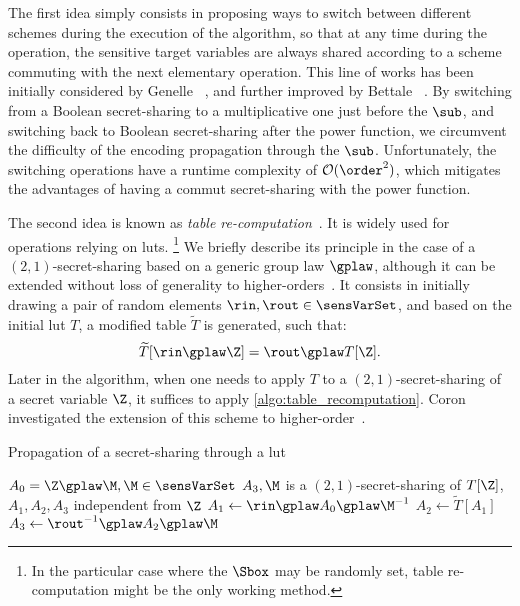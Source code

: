The first idea simply consists in proposing ways to switch between different schemes during the execution of the algorithm, so that at any time during the operation, the sensitive target variables are always shared according to a scheme commuting with the next elementary operation.
This line of works has been initially considered by Genelle \etal{}~\cite{genelle_secure_2010}, and further improved by Bettale \etal{}~\cite{bettale_improved_2018}.
By switching from a Boolean secret-sharing to a multiplicative one just before the \(\sub\), and switching back to Boolean secret-sharing after the power function, we circumvent the difficulty of the encoding propagation through the \(\sub\).
Unfortunately, the switching operations have a runtime complexity of \(\mathcal{O}(\order^2)\), which mitigates the advantages of having a \gls{commut} secret-sharing with the power function.

The second idea is known as \emph{table re-computation}~\cite{akkar_implementation_2001,prouff_generic_2007}.
It is widely used for operations relying on \glspl{lut}.%
\footnote{
    In the particular case where the \(\Sbox\) may be randomly set, table re-computation might be the only working method.
}
We briefly describe its principle in the case of a \((2,1)\)-secret-sharing based on a generic group law \(\gplaw\), although it can be extended without loss of generality to higher-orders~\cite{coron_high_order_2018}.
It consists in initially drawing a pair of random elements \(\rin, \rout \in \sensVarSet\), and based on the initial \gls{lut} \(T\), a modified table \(\widetilde{T}\) is generated, such that:
\begin{equation}
    \widetilde{T}[\rin \gplaw \Z] = \rout \gplaw T[\Z].
\end{equation}
Later in the algorithm, when one needs to apply \(T\) to a \((2,1)\)-secret-sharing of a secret variable \(\Z\), it suffices to apply \autoref{algo:table_recomputation}.
Coron investigated the extension of this scheme to higher-order~\cite{coron_higher_2014}.

\begin{algorithm}
    \centering
    \caption{Propagation of a secret-sharing through a \gls{lut}}
    \begin{algorithmic}
        \Require \(A_0 = \Z \gplaw \M, \M \in \sensVarSet\)
        \Ensure \(A_3, \M\) is a \((2, 1)\)-secret-sharing of \(T[\Z]\), \(A_1, A_2, A_3\) independent from \(\Z\)
        \State \(A_1 \gets \rin \gplaw A_0 \gplaw \M^{-1}\)
        \State \(A_2 \gets \widetilde{T}[A_1]\)
        \State \(A_3 \gets \rout^{-1} \gplaw A_2 \gplaw \M\)
    \end{algorithmic}
    \label{algo:table_recomputation}
\end{algorithm}

